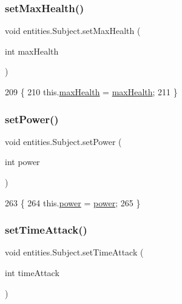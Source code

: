 \subsubsection{\texorpdfstring{set\+Max\+Health()}{setMaxHealth()}}
{\footnotesize\ttfamily void entities.\+Subject.\+set\+Max\+Health (\begin{DoxyParamCaption}\item[{int}]{max\+Health }\end{DoxyParamCaption})\hspace{0.3cm}{\ttfamily [inline]}}


\begin{DoxyCode}
209                                             \{
210         this.\mbox{\hyperlink{classentities_1_1_subject_a72343827eacb9cf3a8807c0b0d1a4ace}{maxHealth}} = \mbox{\hyperlink{classentities_1_1_subject_a72343827eacb9cf3a8807c0b0d1a4ace}{maxHealth}};
211     \}
\end{DoxyCode}
\mbox{\label{classentities_1_1_subject_a5f56d102b27182353d53e68d7459273a}} 
\subsubsection{\texorpdfstring{set\+Power()}{setPower()}}
{\footnotesize\ttfamily void entities.\+Subject.\+set\+Power (\begin{DoxyParamCaption}\item[{int}]{power }\end{DoxyParamCaption})\hspace{0.3cm}{\ttfamily [inline]}}


\begin{DoxyCode}
263                                     \{
264         this.\mbox{\hyperlink{classentities_1_1_subject_a7bd41d6fe9656de66d4a08c4a9565ec4}{power}} = \mbox{\hyperlink{classentities_1_1_subject_a7bd41d6fe9656de66d4a08c4a9565ec4}{power}};
265     \}
\end{DoxyCode}
\mbox{\label{classentities_1_1_subject_a315fc3ace9512285792c6865955e0f17}} 
\subsubsection{\texorpdfstring{set\+Time\+Attack()}{setTimeAttack()}}
{\footnotesize\ttfamily void entities.\+Subject.\+set\+Time\+Attack (\begin{DoxyParamCaption}\item[{int}]{time\+Attack }\end{DoxyParamCaption})\hspace{0.3cm}{\ttfamily [inline]}}


